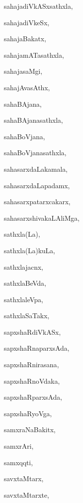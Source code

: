 \begin{multicols}{2}
{sahajadiVkASxsathxla}, \pageref{sahajadiVkASxsathxla}

{sahajadiVkeSx}, \pageref{sahajadiVkeSx}

{sahajaBakatx}, \pageref{sahajaBakatx}

{sahajamATasathxla}, \pageref{sahajamATasathxla}

{sahajasaMgi}, \pageref{sahajasaMgi}

{sahajAvasAthx}, \pageref{sahajAvasAthx}

{sahaBAjana}, \pageref{sahaBAjana}

{sahaBAjanasathxla}, \pageref{sahaBAjanasathxla}

{sahaBoVjana}, \pageref{sahaBoVjana}

{sahaBoVjanasathxla}, \pageref{sahaBoVjanasathxla}

{sahasarxdaLakamala}, \pageref{sahasarxdaLakamala}

{sahasarxdaLapadamx}, \pageref{sahasarxdaLapadamx}

{sahasarxpatarxcakarx}, \pageref{sahasarxpatarxcakarx}

{sahasarxshivakaLAliMga}, \pageref{sahasarxshivakaLAliMga}

{sathxla(La)}, \pageref{sathxlaLa}

{sathxla(La)kuLa}, \pageref{sathxlaLakuLa}

{sathxlajacnx}, \pageref{sathxlajacnx}

{sathxlaBeVda}, \pageref{sathxlaBeVda}

{sathxlaleVpa}, \pageref{sathxlaleVpa}

{sathxlaSaTakx}, \pageref{sathxlaSaTakx}

{sapxshaRdiVkASx}, \pageref{sapxshaRdiVkASx}

{sapxshaRnaparxsAda}, \pageref{sapxshaRnaparxsAda}

{sapxshaRnirasana}, \pageref{sapxshaRnirasana}

{sapxshaRnoVdaka}, \pageref{sapxshaRnoVdaka}

{sapxshaRparxsAda}, \pageref{sapxshaRparxsAda}

{sapxshaRyoVga}, \pageref{sapxshaRyoVga}

{samxraNaBakitx}, \pageref{samxraNaBakitx}

{samxrAri}, \pageref{samxrAri}

{samxqqti}, \pageref{samxqqti}

{savxtaMtarx}, \pageref{savxtaMtarx}

{savxtaMtarxte}, \pageref{savxtaMtarxte}


\end{multicols}
